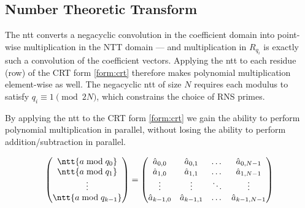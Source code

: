 \subsection{Number Theoretic Transform}
The \gls{ntt} converts a negacyclic convolution in the coefficient domain into point-wise multiplication in the NTT domain --- and multiplication in $R_{q_i}$ is exactly such a convolution of the coefficient vectors. Applying the \gls{ntt} to each residue (row) of the CRT form \eqref{form:crt} therefore makes polynomial multiplication element-wise as well. The negacyclic \gls{ntt} of size $N$ requires each modulus to satisfy $q_i \equiv 1 \pmod{2N}$, which constrains the choice of RNS primes.

\begin{definition}
    By applying the \gls{ntt} to the CRT form \eqref{form:crt} we gain the ability to perform polynomial multiplication in parallel, without losing the ability to perform addition/subtraction in parallel.
    
    \begin{equation}
        \label{form:eval}
        \begin{pmatrix}
            \ntt{a\bmod q_0} \\
            \ntt{a\bmod q_1} \\
            \vdots \\
            \ntt{a\bmod q_{k-1}}
        \end{pmatrix}
        =
        \begin{pmatrix}
            \hat{a}_{0,0} & \hat{a}_{0,1} & \dots & \hat{a}_{0,N-1} \\
            \hat{a}_{1,0} & \hat{a}_{1,1} & \dots & \hat{a}_{1,N-1} \\
            \vdots & \vdots & \ddots & \vdots \\
            \hat{a}_{k-1,0} & \hat{a}_{k-1,1} & \dots & \hat{a}_{k-1,N-1}
        \end{pmatrix}
    \end{equation}
    
\end{definition}

